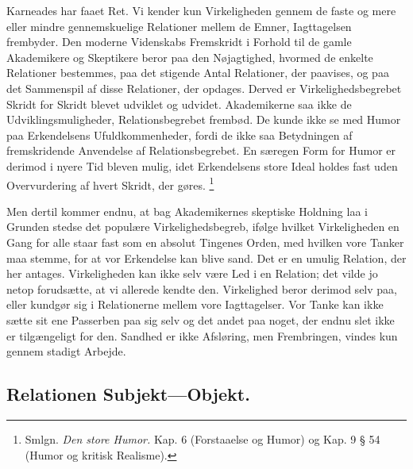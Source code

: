 \documentclass[12pt]{article}
\newcommand{\opage}[1]{\marginnote{\footnotesize\textit{[#1]}}}
\begin{document}
Karneades har faaet Ret. Vi kender kun Virkeligheden
\opage{57} \setcounter{footnote}{0}
gennem de faste og mere eller mindre gennemskuelige Relationer mellem de
Emner, Iagttagelsen frembyder. Den moderne Videnskabs Fremskridt i
Forhold til de gamle Akademikere og Skeptikere beror paa den Nøjagtighed,
hvormed de enkelte Relationer bestemmes, paa det stigende Antal
Relationer, der paavises, og paa det Sammenspil af disse Relationer, der
opdages. Derved er Virkelighedsbegrebet Skridt for Skridt blevet udviklet
og udvidet. Akademikerne saa ikke de Udviklingsmuligheder,
Relationsbegrebet frembød. De kunde ikke se med Humor paa Erkendelsens
Ufuldkommenheder, fordi de ikke saa Betydningen af fremskridende
Anvendelse af Relationsbegrebet. En særegen Form for Humor er derimod i
nyere Tid bleven mulig, idet Erkendelsens store Ideal holdes fast uden
Overvurdering af hvert Skridt, der gøres.%
\footnote{Smlgn. \textit{Den store Humor.} Kap. 6 (Forstaaelse og Humor)
og Kap. 9 § 54 (Humor og kritisk Realisme).}

Men dertil kommer endnu, at bag Akademikernes skeptiske Holdning laa i
Grunden stedse det populære Virkelighedsbegreb, ifølge hvilket
Virkeligheden en Gang for alle staar fast som en absolut Tingenes Orden,
med hvilken vore Tanker maa stemme, for at vor Erkendelse kan blive sand.
Det er en umulig Relation, der her antages. Virkeligheden kan ikke selv
være Led i en Relation; det vilde jo netop forudsætte, at vi allerede
kendte den. Virkelighed beror derimod selv paa, eller kundgør sig i
Relationerne mellem vore Iagttagelser. Vor Tanke kan ikke sætte sit ene
Passerben paa sig selv og det andet paa noget, der endnu slet ikke er
tilgængeligt for den. Sandhed er ikke Afsløring, men Frembringen, vindes
kun gennem stadigt Arbejde.

\opage{58} %
\subsection{Relationen Subjekt---Objekt.}\label{sec:3d}
\end{document}
